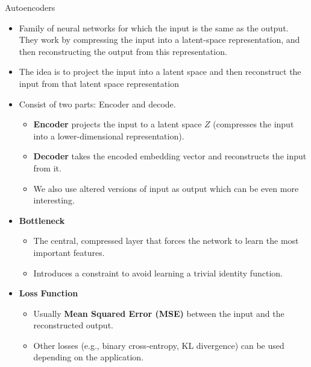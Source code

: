 \begin{frame}[allowframebreaks]{Autoencoders}
\begin{itemize}
    \item Family of neural networks for which the input is the same as the output. They work by compressing the input into a latent-space representation, and then reconstructing the output from this representation.
    \item The idea is to project the input into a latent space and then reconstruct the input from that latent space representation
    \item Consist of two parts: Encoder and decode.
    \begin{itemize}
        \item \textbf{Encoder} projects the input to a latent space $Z$ (compresses the input into a lower-dimensional representation). 
        \item \textbf{Decoder} takes the encoded embedding vector and reconstructs the input from it.
    \item We also use altered versions of input as output which can be even more interesting.
    \end{itemize}
\end{itemize}

\framebreak

\begin{itemize}
    \item \textbf{Bottleneck}
    \begin{itemize}
        \item The central, compressed layer that forces the network to learn the most important features.
        \item Introduces a constraint to avoid learning a trivial identity function.
    \end{itemize}
    \item \textbf{Loss Function}
    \begin{itemize}
        \item Usually \textbf{Mean Squared Error (MSE)} between the input and the reconstructed output.
        \item Other losses (e.g., binary cross-entropy, KL divergence) can be used depending on the application.
    \end{itemize}
\end{itemize}
\end{frame}